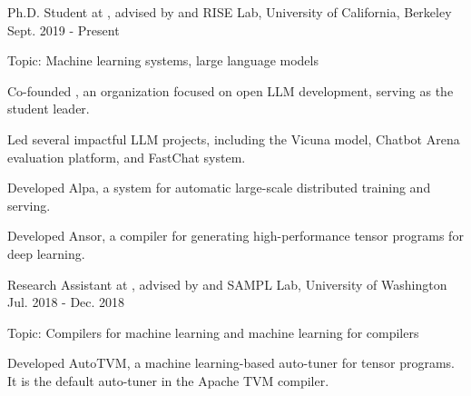 

\begin{cventries}


\cventry
	{Ph.D. Student at , advised by 
     and
    } %
	{RISE Lab, University of California, Berkeley} %
	{Sept. 2019 - Present} %
	{} %
	{
		\begin{cvitems} %
			\item{Topic: Machine learning systems, large language models}
			\item{Co-founded , an organization focused on open LLM development, serving as the student leader.}
			\item{Led several impactful LLM projects, including the Vicuna model, Chatbot Arena evaluation platform, and FastChat system.}
			\item{Developed Alpa, a system for automatic large-scale distributed training and serving.}
			\item{Developed Ansor, a compiler for generating high-performance tensor programs for deep learning.}
		\end{cvitems}
	}


\cventry
	{Research Assistant at , advised by  and } %
	{SAMPL Lab, University of Washington} %
	{Jul. 2018 - Dec. 2018} %
	{} %
	{
		\begin{cvitems} %
			\item{Topic: Compilers for machine learning and machine learning for compilers}
			\item{Developed AutoTVM, a machine learning-based auto-tuner for tensor programs. It is the default auto-tuner in the Apache TVM compiler.}
		\end{cvitems}
	}


\end{cventries}
